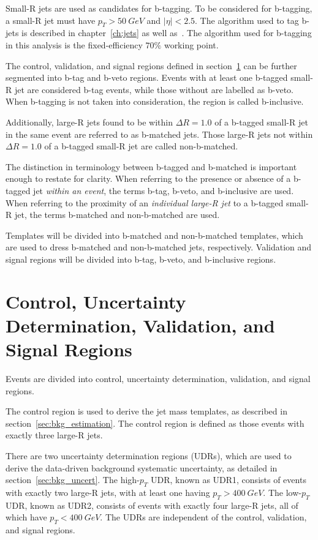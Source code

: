 Small-R jets are used as candidates for b-tagging.
To be considered for b-tagging, a small-R jet must have $p_{T}>50~GeV$ and $|\eta|<2.5$.
The algorithm used to tag b-jets is described in chapter~\ref{ch:jets} as well as~\cite{b-jet-perf-1,b-jet-perf-2}.
The algorithm used for b-tagging in this analysis is the fixed-efficiency $70\%$ working point.

The control, validation, and signal regions defined in section~\ref{sec:region_defs} can be further segmented into b-tag and b-veto regions.
Events with at least one b-tagged small-R jet are considered b-tag events, while those without are labelled as b-veto.
When b-tagging is not taken into consideration, the region is called b-inclusive.

Additionally, large-R jets found to be within $\Delta R=1.0$ of a b-tagged small-R jet in the same event are referred to as b-matched jets.
Those large-R jets not within $\Delta R=1.0$ of a b-tagged small-R jet are called non-b-matched.

The distinction in terminology between b-tagged and b-matched is important enough to restate for clarity.
When referring to the presence or absence of a b-tagged jet \textit{within an event}, the terms b-tag, b-veto, and b-inclusive are used.
When referring to the proximity of an \textit{individual large-R jet} to a b-tagged small-R jet, the terms b-matched and non-b-matched are used.

Templates will be divided into b-matched and non-b-matched templates, which are used to dress b-matched and non-b-matched jets, respectively.
Validation and signal regions will be divided into b-tag, b-veto, and b-inclusive regions.

\section{Control, Uncertainty Determination, Validation, and Signal Regions} \label{sec:region_defs}
Events are divided into control, uncertainty determination, validation, and signal regions.

The control region is used to derive the jet mass templates, as described in section~\ref{sec:bkg_estimation}.
The control region is defined as those events with exactly three large-R jets.

There are two uncertainty determination regions (UDRs), which are used to derive the data-driven background systematic uncertainty,
as detailed in section~\ref{sec:bkg_uncert}.
The high-$p_{T}$ UDR, known as UDR1, consists of events with exactly two large-R jets, with at least one having $p_{T}>400~GeV$.
The low-$p_{T}$ UDR, known as UDR2, consists of events with exactly four large-R jets, all of which have $p_{T}<400~GeV$.
The UDRs are independent of the control, validation, and signal regions.

